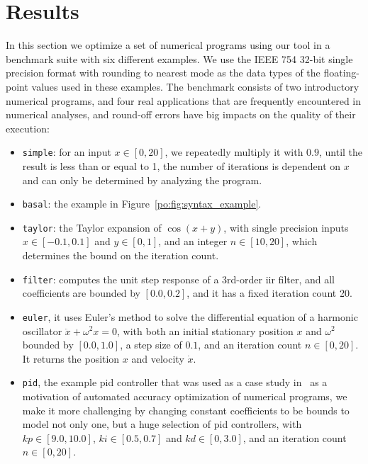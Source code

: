 \section{Results}
\label{po:sec:results}

In this section we optimize a set of numerical programs using our tool in
a benchmark suite with six different examples.  We use the IEEE 754 32-bit
single precision format with rounding to nearest mode as the data types of the
floating-point values used in these examples.  The benchmark consists of two
introductory numerical programs, and four real applications that are frequently
encountered in numerical analyses, and round-off errors have big impacts on the
quality of their execution:
\begin{itemize}

    \item \texttt{simple}: for an input $x \in [0, 20]$, we repeatedly multiply
    it with $0.9$, until the result is less than or equal to 1, the number of
    iterations is dependent on $x$ and can only be determined by analyzing the
    program.

    \item \texttt{basal}: the example in Figure~\ref{po:fig:syntax_example}.

    \item \texttt{taylor}: the Taylor expansion of $\cos(x + y)$, with single
    precision inputs $x \in [-0.1, 0.1]$ and $y \in [0, 1]$, and an integer $n
    \in [10, 20]$, which determines the bound on the iteration count.

    \item \texttt{filter}: computes the unit step response of a 3rd-order
    \gls{iir} filter, and all coefficients are bounded by $[0.0, 0.2]$, and it
    has a fixed iteration count 20.

    \item \texttt{euler}, it uses Euler's method to solve the differential
    equation of a harmonic oscillator $\ddot{x} + \omega^2 x = 0$, with both an
    initial stationary position $x$ and $\omega^2$ bounded by $[0.0, 1.0]$, a
    step size of $0.1$, and an iteration count $n \in [0, 20]$.  It returns the
    position $x$ and velocity $\dot{x}$.

    \item \texttt{pid}, the example \gls{pid} controller that was used as a
    case study in~\cite{damouche14} as a motivation of automated accuracy
    optimization of numerical programs, we make it more challenging by changing
    constant coefficients to be bounds to model not only one, but a huge
    selection of \gls{pid} controllers, with $kp \in [9.0, 10.0]$, $ki \in
    [0.5, 0.7]$ and $kd \in [0, 3.0]$, and an iteration count $n \in [0, 20]$.

\end{itemize}

